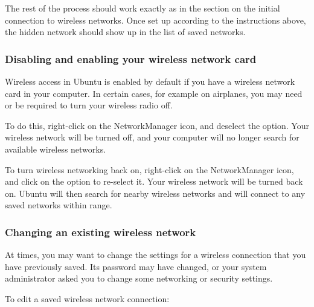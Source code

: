 The rest of the process should work exactly as in the section on the initial
connection to wireless networks. Once set up according to the instructions
above, the hidden network should show up in the list of saved networks.

\subsubsection{Disabling and enabling your wireless network card}

Wireless access in Ubuntu is enabled by default if you have a wireless network
card in your computer. In certain cases, for example on airplanes, you may
need or be required to turn your wireless radio off.

To do this, right-click on the NetworkManager icon, and deselect the 
 option. Your wireless network will be turned off,
and your computer will no longer search for available wireless networks.

To turn wireless networking back on, right-click on the NetworkManager
icon, and click on the  option to re-select it.
Your wireless network will be turned back on. Ubuntu will then search 
for nearby wireless networks and will connect to any saved networks within
range.

\subsubsection{Changing an existing wireless network}

At times, you may want to change the settings for a wireless connection
that you have previously saved. Its password may have changed, or 
your system administrator asked you to change some networking or security
settings.

To edit a saved wireless network connection:


